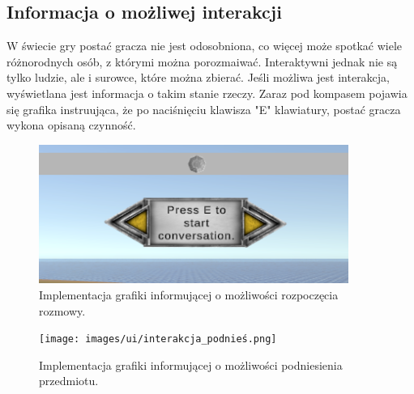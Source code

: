 \subsection{Informacja o możliwej interakcji}
W świecie gry postać gracza nie jest odosobniona, co więcej może spotkać wiele różnorodnych osób, z którymi można porozmaiwać. Interaktywni
jednak nie są tylko ludzie, ale i surowce, które można zbierać. Jeśli możliwa jest interakcja,  wyświetlana jest informacja o takim stanie
 rzeczy. Zaraz pod kompasem pojawia się grafika instruująca, że po naciśnięciu klawisza "E" klawiatury, postać gracza wykona opisaną czynność.
 \begin{figure}[htbp]
    \centering
    \includegraphics[width=0.9\textwidth]{images/ui/interakcja_rozmowa.png}
    \caption{Implementacja grafiki informującej o możliwości rozpoczęcia rozmowy.}\label{fig:rozmow}
\end{figure}
\begin{figure}[htbp]
    \centering
    \texttt{[image: images/ui/interakcja\_podnieś.png]}
    \caption{Implementacja grafiki informującej o możliwości podniesienia przedmiotu.}\label{fig:przedmio}
\end{figure}

